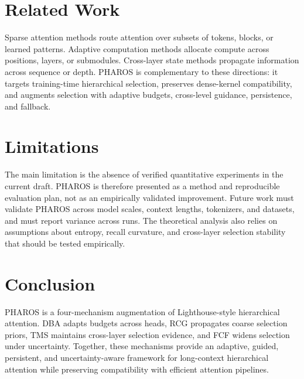 \documentclass[letterpaper]{article}
\begin{document}
\section{Related Work}
Sparse attention methods route attention over subsets of tokens, blocks, or learned patterns. Adaptive computation methods allocate compute across positions, layers, or submodules. Cross-layer state methods propagate information across sequence or depth. PHAROS is complementary to these directions: it targets training-time hierarchical selection, preserves dense-kernel compatibility, and augments selection with adaptive budgets, cross-level guidance, persistence, and fallback.

\section{Limitations}
The main limitation is the absence of verified quantitative experiments in the current draft. PHAROS is therefore presented as a method and reproducible evaluation plan, not as an empirically validated improvement. Future work must validate PHAROS across model scales, context lengths, tokenizers, and datasets, and must report variance across runs. The theoretical analysis also relies on assumptions about entropy, recall curvature, and cross-layer selection stability that should be tested empirically.

\section{Conclusion}
PHAROS is a four-mechanism augmentation of Lighthouse-style hierarchical attention. DBA adapts budgets across heads, RCG propagates coarse selection priors, TMS maintains cross-layer selection evidence, and FCF widens selection under uncertainty. Together, these mechanisms provide an adaptive, guided, persistent, and uncertainty-aware framework for long-context hierarchical attention while preserving compatibility with efficient attention pipelines.




\end{document}
